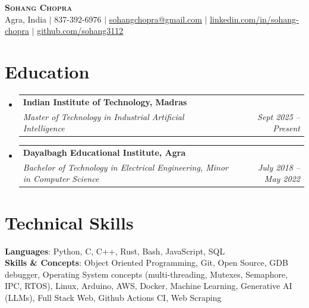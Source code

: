 \documentclass[letterpaper,11pt]{article}
\makeatletter
\newcommand{\resumeSubheading}[4]{
  \vspace{-2pt}\item
    \begin{tabular*}{0.97\textwidth}[t]{l@{\extracolsep{\fill}}r}
      \textbf{#1} & #2 \\
      \textit{\small#3} & \textit{\small #4} \\
    \end{tabular*}\vspace{-7pt}
}
\newcommand{\resumeSubHeadingListStart}{\begin{itemize}[leftmargin=0.15in, label={}]}
\newcommand{\resumeSubHeadingListEnd}{\end{itemize}}
\makeatother
\begin{document}
\begin{center}
    \textbf{\Huge \scshape Sohang Chopra} \\ \vspace{1pt}
    \small Agra, India $|$ \vspace{1pt}
    \small 837-392-6976 $|$ \href{mailto:sohangchopra@gmail.com}{\underline{sohangchopra@gmail.com}} $|$ 
    \href{https://linkedin.com/in/sohang-chopra}{\underline{linkedin.com/in/sohang-chopra}} $|$
    \href{https://github.com/sohang3112}{\underline{github.com/sohang3112}}
\end{center}

\section{Education}
  \resumeSubHeadingListStart
    \resumeSubheading
      {Indian Institute of Technology, Madras}
      {}
      {Master of Technology in Industrial Artificial Intelligence}
      {Sept 2025 -- Present}
  
    \resumeSubheading
      {Dayalbagh Educational Institute, Agra}{}
      {Bachelor of Technology in Electrical Engineering, Minor in Computer Science}{July 2018 -- May 2022}
  \resumeSubHeadingListEnd

\section{Technical Skills}
 \begin{itemize}[leftmargin=0.15in, label={}]
    \small{\item{
     \textbf{Languages}{: Python, C, C++, Rust, Bash, JavaScript, SQL} \\
     \textbf{Skills \& Concepts}{: Object Oriented Programming, Git, Open Source, GDB debugger, Operating System concepts (multi-threading, Mutexes, Semaphore, IPC, RTOS), Linux, Arduino, AWS, Docker, Machine Learning, Generative AI (LLMs), Full Stack Web,  Github Actions CI, Web Scraping} \\
    }}
 \end{itemize}
\end{document}
